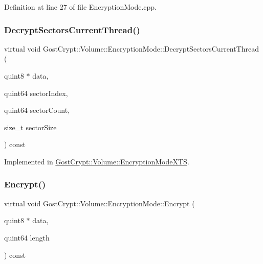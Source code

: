 Definition at line 27 of file Encryption\+Mode.\+cpp.

\mbox{\label{class_gost_crypt_1_1_volume_1_1_encryption_mode_ac0aff16d606ff0097344d0af157cb8f5}} 
\subsubsection{\texorpdfstring{Decrypt\+Sectors\+Current\+Thread()}{DecryptSectorsCurrentThread()}}
{\footnotesize\ttfamily virtual void Gost\+Crypt\+::\+Volume\+::\+Encryption\+Mode\+::\+Decrypt\+Sectors\+Current\+Thread (\begin{DoxyParamCaption}\item[{quint8 $\ast$}]{data,  }\item[{quint64}]{sector\+Index,  }\item[{quint64}]{sector\+Count,  }\item[{size\+\_\+t}]{sector\+Size }\end{DoxyParamCaption}) const\hspace{0.3cm}{\ttfamily [pure virtual]}}



Implemented in \hyperlink{class_gost_crypt_1_1_volume_1_1_encryption_mode_x_t_s_a391a08eb12f92d855ac49dd3e7fddaf0}{Gost\+Crypt\+::\+Volume\+::\+Encryption\+Mode\+X\+TS}.

\mbox{\label{class_gost_crypt_1_1_volume_1_1_encryption_mode_a1ad315d9067c222eb693e2ea0e06343e}} 
\subsubsection{\texorpdfstring{Encrypt()}{Encrypt()}}
{\footnotesize\ttfamily virtual void Gost\+Crypt\+::\+Volume\+::\+Encryption\+Mode\+::\+Encrypt (\begin{DoxyParamCaption}\item[{quint8 $\ast$}]{data,  }\item[{quint64}]{length }\end{DoxyParamCaption}) const\hspace{0.3cm}{\ttfamily [pure virtual]}}



